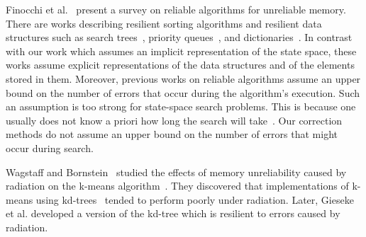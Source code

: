 \documentclass[letterpaper]{article}
\begin{document}
Finocchi et al.~ present a survey on reliable algorithms for unreliable memory. There are works describing resilient sorting algorithms and resilient data structures such as search trees~\cite{finocchi2007resilient}, priority queues~\cite{jorgensen2007priority}, and dictionaries~\cite{brodal2007optimal}. In contrast with our work which assumes an implicit representation of the state space, these works assume explicit representations of the data structures and of the elements stored in them. Moreover, previous works on reliable algorithms assume an upper bound on the number of errors that occur during the algorithm's execution. Such an assumption is too strong for state-space search problems. This is because one usually does not know a priori how long the search will take~\cite{Knuth75}. Our correction methods do not assume an upper bound on the number of errors that might occur during search.

Wagstaff and Bornstein~ studied the effects of memory unreliability caused by radiation on the k-means algorithm~\cite{mcqueen67}. %
They discovered that implementations of k-means using kd-trees~\cite{Kanetal2002} tended to perform poorly under radiation. Later, Gieseke et al.  developed a version of the kd-tree which is resilient to errors caused by radiation.

\end{document}

